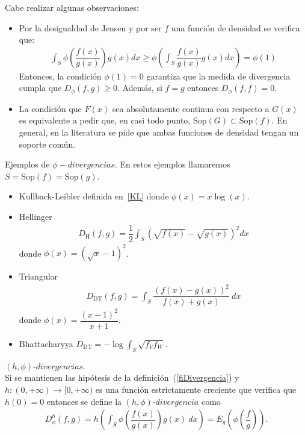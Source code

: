 Cabe realizar algunas observaciones:

\begin{itemize}
	\item Por la desigualdad de Jensen y por ser $f$ una función de densidad se verifica que:
	\begin{align}
	\displaystyle \int_{S} \phi\left(\dfrac{f(x)}{g(x)}\right) g(x) dx \geq \phi\left(\int_{S} \dfrac{f(x)}{g(x)} g(x) dx\right)=\phi(1)
\end{align}
    Entonces, la condición $\phi(1)=0$ garantiza que la medida de divergencia cumpla que $D_{\phi}(f, g) \geq 0.$ Además, si $f=g$ entonces $D_{\phi}(f, f)= 0.$ 
    \item La condición que $F(x)$ sea absolutamente continua con respecto a $G(x)$ es equivalente a pedir que, en casi todo punto, $\mathrm{Sop}(G) \subset \mathrm{Sop}(f).$ En general, en la literatura se pide que ambas funciones de densidad tengan un soporte común.
\end{itemize}

\begin{example} Ejemplos de $\phi-divergencias$. En estos ejemplos llamaremos $S=\mathrm{Sop}(f)=\mathrm{Sop}(g).$
	\begin{itemize}
		\item Kullback-Leibler definida en~\ref{KL} donde $\phi(x)=x \log(x)$.
		\item Hellinger
		\begin{align} 
		D_{\text{H}}(f,g)=\dfrac{1}{2} \displaystyle \int_{S} \left(\sqrt{f(x)}-\sqrt{g(x)}\right)^2 dx
		\end{align}
		donde $\phi(x)=\left(\sqrt{x}-1\right)^2$.
		\item Triangular
		\begin{align}
		D_{\text{DT}}(f,g)=\displaystyle \int_{S} \dfrac{\left(f(x)-g(x)\right)^2}{f(x)+g(x)} \ dx
		\end{align}
		donde $\phi(x)=\dfrac{\left(x-1 \right)^2}{x+1}$.
		\item Bhattacharyya $D_{\text{DT}}=-\log \displaystyle \int_{S} \sqrt{f_Vf_W}$.
	\end{itemize}
\end{example}

\begin{definition} $\left(h,\phi\right) \text{-} divergencias$.\\
	\label{hfiDivergencia}
	Si se mantienen las hipótesis de la definición~(\ref{fiDivergencia}) y $h: (0,+\infty)\longrightarrow [0,+\infty)$ es una función estrictamente creciente que verifica que $h(0)=0$ entonces se define la $\left(h,\phi\right) \text{-} divergencia$ como
	\begin{align}
	D^h_{\phi}(f, g)=h\left(\int_{S} \phi\left(\dfrac{f(x)}{g(x)}\right) g(x) \ dx\right)=E_{g}\left(\phi\left(\dfrac{f}{g}\right)\right).
	\end{align}
\end{definition}
	
